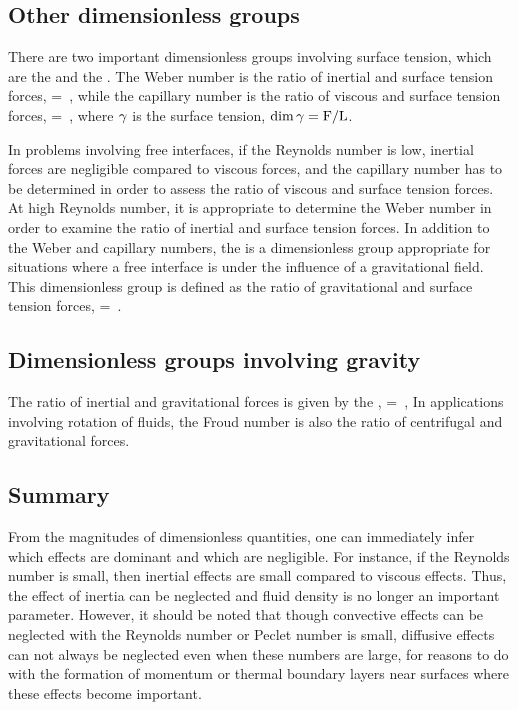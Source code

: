 \subsection{Other dimensionless groups}
There are two important dimensionless groups involving surface tension, which are the  and the . The Weber number is the ratio of inertial and surface tension forces,
\beq
\kweber = \dfrac{\dens\vel^2\length}{\surftens}\,,
\eeq
while the capillary number is the ratio of viscous and surface tension forces,
\beq
\kcapillar = \dfrac{\dynvis\vel}{\surftens}\,,
\eeq
where $\gamma$ is the surface tension, $\dim\gamma = \text{F}/\text{L}$.

In problems involving free interfaces, if the Reynolds number is low, inertial forces are negligible compared to viscous forces, and the capillary number has to be determined in order to assess the ratio of viscous and surface tension forces. At high Reynolds number, it is appropriate to determine the Weber number in order to examine the ratio of inertial and surface tension forces. In addition to the Weber and capillary numbers, the  is a dimensionless group appropriate for situations where a free interface is under the influence of a gravitational field. This dimensionless group is defined as the ratio of gravitational and surface tension forces,
\beq
\kbond = \,.
\eeq


\subsection{Dimensionless groups involving gravity}
The ratio of inertial and gravitational forces is given by the ,
\beq
\kfroud = \,,
\eeq
In applications involving rotation of fluids, the Froud number is also the ratio of centrifugal and gravitational forces.


\subsection{Summary}
From the magnitudes of dimensionless quantities, one can immediately infer which effects are dominant and which are negligible. For instance, if the Reynolds number is small, then inertial effects are small compared to viscous effects. Thus, the effect of inertia can be neglected and fluid density is no longer an important parameter. However, it should be noted that though convective effects can be neglected with the Reynolds number or Peclet number is small, diffusive effects can not always be neglected even when these numbers are large, for reasons to do with the formation of momentum or thermal boundary layers near surfaces where these effects become important.
